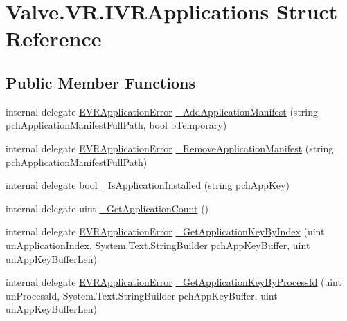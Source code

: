 \hypertarget{struct_valve_1_1_v_r_1_1_i_v_r_applications}{}\section{Valve.\+V\+R.\+I\+V\+R\+Applications Struct Reference}
\label{struct_valve_1_1_v_r_1_1_i_v_r_applications}
\subsection*{Public Member Functions}
\begin{DoxyCompactItemize}
\item 
internal delegate \mbox{\hyperlink{namespace_valve_1_1_v_r_a3488adab8a219b579fcee50f4e63a8b6}{E\+V\+R\+Application\+Error}} \mbox{\hyperlink{struct_valve_1_1_v_r_1_1_i_v_r_applications_a76f61ada24748861c48a7a358a129f02}{\+\_\+\+Add\+Application\+Manifest}} (string pch\+Application\+Manifest\+Full\+Path, bool b\+Temporary)
\item 
internal delegate \mbox{\hyperlink{namespace_valve_1_1_v_r_a3488adab8a219b579fcee50f4e63a8b6}{E\+V\+R\+Application\+Error}} \mbox{\hyperlink{struct_valve_1_1_v_r_1_1_i_v_r_applications_af57c8e14b228aa90c1de06e488d188e1}{\+\_\+\+Remove\+Application\+Manifest}} (string pch\+Application\+Manifest\+Full\+Path)
\item 
internal delegate bool \mbox{\hyperlink{struct_valve_1_1_v_r_1_1_i_v_r_applications_a55c08f26570b4ebbcc12d975a0580058}{\+\_\+\+Is\+Application\+Installed}} (string pch\+App\+Key)
\item 
internal delegate uint \mbox{\hyperlink{struct_valve_1_1_v_r_1_1_i_v_r_applications_ad5a465e75026a5c1bf8e787a8613132b}{\+\_\+\+Get\+Application\+Count}} ()
\item 
internal delegate \mbox{\hyperlink{namespace_valve_1_1_v_r_a3488adab8a219b579fcee50f4e63a8b6}{E\+V\+R\+Application\+Error}} \mbox{\hyperlink{struct_valve_1_1_v_r_1_1_i_v_r_applications_a63e1092a4592ad95064f4948b5bc743f}{\+\_\+\+Get\+Application\+Key\+By\+Index}} (uint un\+Application\+Index, System.\+Text.\+String\+Builder pch\+App\+Key\+Buffer, uint un\+App\+Key\+Buffer\+Len)
\item 
internal delegate \mbox{\hyperlink{namespace_valve_1_1_v_r_a3488adab8a219b579fcee50f4e63a8b6}{E\+V\+R\+Application\+Error}} \mbox{\hyperlink{struct_valve_1_1_v_r_1_1_i_v_r_applications_aeadcd6cb5dd134f4d83e9d34d05a6318}{\+\_\+\+Get\+Application\+Key\+By\+Process\+Id}} (uint un\+Process\+Id, System.\+Text.\+String\+Builder pch\+App\+Key\+Buffer, uint un\+App\+Key\+Buffer\+Len)

\end{DoxyCompactItemize}
